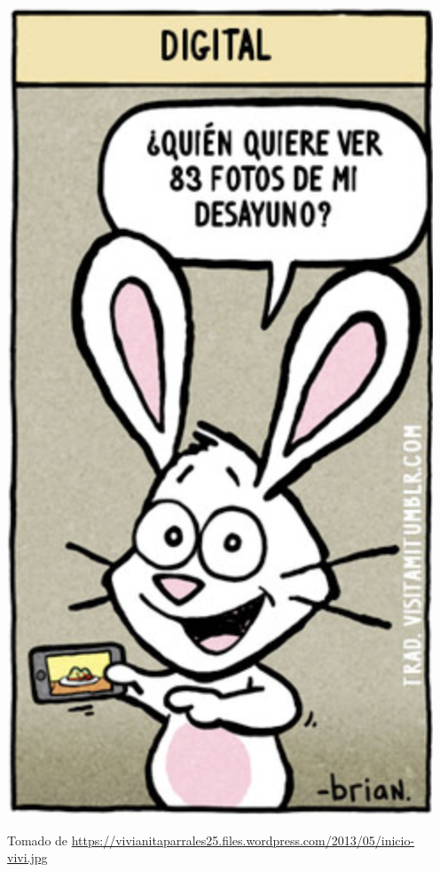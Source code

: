 \documentclass[
10pt, %
aspectratio=169, %
]{beamer}
\begin{document}
\begin{frame}
\begin{minipage}{.5\textwidth}
		\end{minipage}%
		\begin{minipage}{.55\textwidth}
			\centering
			\includegraphics[scale=0.43]{digital.png} 
			
			{\scriptsize Tomado de \url{https://vivianitaparrales25.files.wordpress.com/2013/05/inicio-vivi.jpg}}
		\end{minipage}
		
	\end{frame}
	
\end{document}
